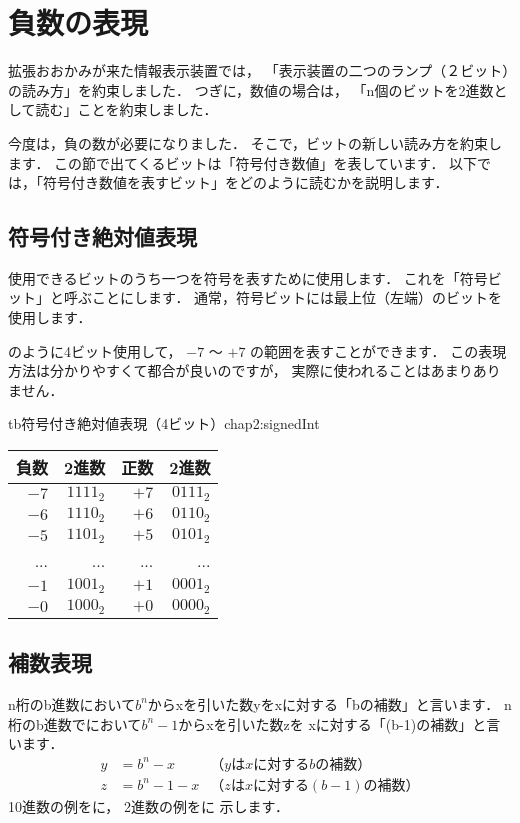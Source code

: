 \section{負数の表現}
\label{minus}
拡張おおかみが来た情報表示装置では，
「表示装置の二つのランプ（２ビット）の読み方」を約束しました．
つぎに，数値の場合は，
「n個のビットを2進数として読む」ことを約束しました．

今度は，負の数が必要になりました．
そこで，ビットの新しい読み方を約束します．
この節で出てくるビットは「符号付き数値」を表しています．
以下では，「符号付き数値を表すビット」をどのように読むかを説明します．

\subsection{符号付き絶対値表現}
使用できるビットのうち一つを符号を表すために使用します．
これを「符号ビット」と呼ぶことにします．
通常，符号ビットには最上位（左端）のビットを使用します．

のように4ビット使用して，
$-7$ 〜 $+7$ の範囲を表すことができます．
この表現方法は分かりやすくて都合が良いのですが，
実際に使われることはあまりありません．

\begin{mytable}{tb}{符号付き絶対値表現（4ビット）}{chap2:signedInt}
{\small\begin{tabular}{ r | r || r | r }
\hline
\hline
負数 & 2進数    & 正数 & 2進数 \\
\hline
$-7$ & $1111_2$ & $+7$ & $0111_2$ \\
$-6$ & $1110_2$ & $+6$ & $0110_2$ \\
$-5$ & $1101_2$ & $+5$ & $0101_2$ \\
...  & ...      & ...  & ... \\
$-1$ & $1001_2$ & $+1$ & $0001_2$ \\
$-0$ & $1000_2$ & $+0$ & $0000_2$ \\
\end{tabular}}
\end{mytable}

\subsection{補数表現}
n桁のb進数において$b^n$からxを引いた数yをxに対する「bの補数」と言います．
n桁のb進数でにおいて$b^n-1$からxを引いた数zを
xに対する「(b-1)の補数」と言います．
{\small\begin{align*}
y&= b^n-x     &（yはxに対するbの補数） \\
z&= b^n-1-x   &（zはxに対する(b-1)の補数）
\end{align*}}
10進数の例をに，
2進数の例をに
示します．

